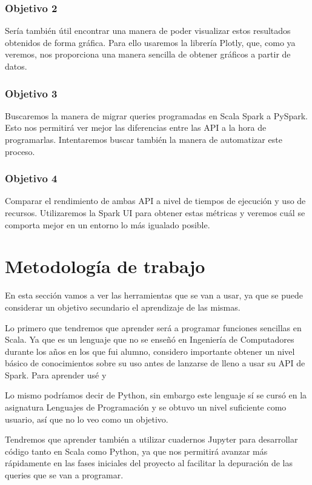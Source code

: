 \documentclass[12pt,twoside,titlepage]{report}
\begin{document}
\subsubsection{Objetivo 2}

Sería también útil encontrar una manera de poder visualizar estos resultados obtenidos de forma gráfica. Para ello usaremos la librería Plotly, que, como ya veremos, nos proporciona una manera sencilla de obtener gráficos a partir de datos.

\subsubsection{Objetivo 3}

Buscaremos la manera de migrar queries programadas en Scala Spark a PySpark. Esto nos permitirá ver mejor las diferencias entre las API a la hora de programarlas. Intentaremos buscar también la manera de automatizar este proceso.

\subsubsection{Objetivo 4}

Comparar el rendimiento de ambas API a nivel de tiempos de ejecución y uso de recursos. Utilizaremos la Spark UI para obtener estas métricas y veremos cuál se comporta mejor en un entorno lo más igualado posible.


\section{Metodología de trabajo}

En esta sección vamos a ver las herramientas que se van a usar, ya que se puede considerar un objetivo secundario el aprendizaje de las mismas.

Lo primero que tendremos que aprender será a programar funciones sencillas en Scala. Ya que es un lenguaje que no se enseñó en Ingeniería de Computadores durante los años en los que fui alumno, considero importante obtener un nivel básico de conocimientos sobre su uso antes de lanzarse de lleno a usar su API de Spark. Para aprender usé \cite{scalabook} y \cite{ScalaAPI}

Lo mismo podríamos decir de Python, sin embargo este lenguaje sí se cursó en la asignatura Lenguajes de Programación y se obtuvo un nivel suficiente como usuario, así que no lo veo como un objetivo.

Tendremos que aprender también a utilizar cuadernos Jupyter para desarrollar código tanto en Scala como Python, ya que nos permitirá avanzar más rápidamente en las fases iniciales del proyecto al facilitar la depuración de las queries que se van a programar.
\end{document}
